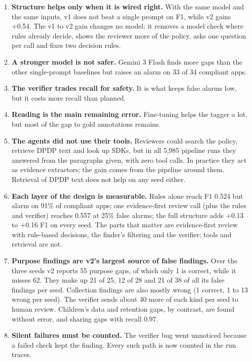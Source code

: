 \documentclass[11pt,a4paper]{article}
\begin{document}
\begin{enumerate}
  \item \textbf{Structure helps only when it is wired right.} With the same model and the same
        inputs, v1 does not beat a single prompt on F1, while v2 gains +0.54. The v1 to v2 gain
        changes no model: it removes a model check where rules already decide, shows the reviewer
        more of the policy, asks one question per call and fixes two decision rules.
  \item \textbf{A stronger model is not safer.} Gemini 3 Flash finds more gaps than the other
        single-prompt baselines but raises an alarm on 33 of 34 compliant apps.
  \item \textbf{The verifier trades recall for safety.} It is what keeps false alarms low, but it
        costs more recall than planned.
  \item \textbf{Reading is the main remaining error.} Fine-tuning helps the tagger a lot, but most
        of the gap to gold annotations remains.
  \item \textbf{The agents did not use their tools.} Reviewers could search the policy, retrieve DPDP
        text and look up SDKs, but in all 5,985 pipeline runs they answered from the paragraphs
        given, with zero tool calls. In practice they act as evidence extractors; the gain comes
        from the pipeline around them. Retrieval of DPDP text does not help on any seed either.
  \item \textbf{Each layer of the design is measurable.} Rules alone reach F1 0.524 but alarm on
        91\% of compliant apps; one evidence-first review call (plus the rules and verifier) reaches
        0.557 at 25\% false alarms; the full structure adds +0.13 to +0.16 F1 on every seed. The
        parts that matter are evidence-first review with rule-based decisions, the finder's
        filtering and the verifier; tools and retrieval are not.
  \item \label{find:purpose}\textbf{Purpose findings are v2's largest source of false findings.}
        Over the three seeds v2 reports 55 purpose gaps, of which only 1 is correct, while it misses
        62. They make up 21 of 25, 12 of 28 and 21 of 38 of all its false findings per seed.
        Collection findings are also mostly wrong (1 correct, 1 to 13 wrong per seed). The verifier
        sends about 40 more of each kind per seed to human review. Children's data and retention
        gaps, by contrast, are found without error, and sharing gaps with recall 0.97.
  \item \textbf{Silent failures must be counted.} The verifier bug went unnoticed because a failed
        check kept the finding. Every such path is now counted in the run traces.
\end{enumerate}
\end{document}
